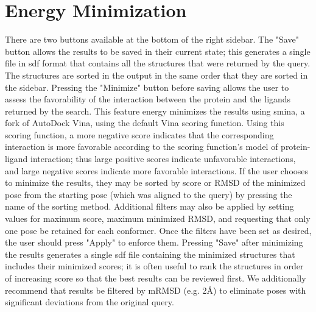 \section{Energy Minimization}

\cite{smina}

There are two buttons available at the bottom of the right sidebar. The "Save" button allows the results to be saved in their current state; this generates a single file in sdf format that contains all the structures that were returned by the query. The structures are sorted in the output in the same order that they are sorted in the sidebar. Pressing the "Minimize" button before saving allows the user to assess the favorability of the interaction between the protein and the ligands returned by the search. This feature energy minimizes the results using smina, a fork of AutoDock Vina, using the default Vina scoring function. Using this scoring function, a more negative score indicates that the corresponding interaction is more favorable according to the scoring function's model of protein-ligand interaction; thus large positive scores indicate unfavorable interactions, and large negative scores indicate more favorable interactions. If the user chooses to minimize the results, they may be sorted by score or RMSD of the minimized pose from the starting pose (which was aligned to the query) by pressing the name of the sorting method. Additional filters may also be applied by setting values for maximum score, maximum minimized RMSD, and requesting that only one pose be retained for each conformer. Once the filters have been set as desired, the user should press "Apply" to enforce them. Pressing "Save" after minimizing the results generates a single sdf file containing the minimized structures that includes their minimized scores; it is often useful to rank the structures in order of increasing score so that the best results can be reviewed first. We additionally recommend that results be filtered by mRMSD (e.g. 2Å) to eliminate poses with significant deviations from the original query. 